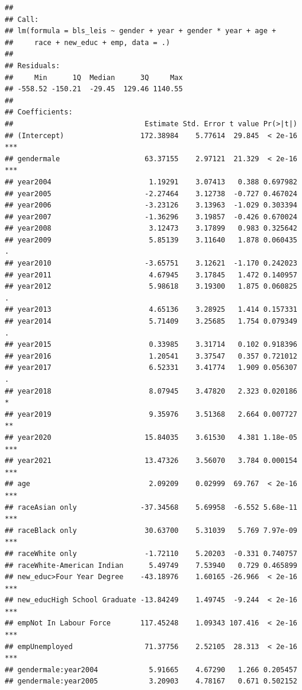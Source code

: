 \documentclass[
]{article}
\begin{document}
\begin{verbatim}
## 
## Call:
## lm(formula = bls_leis ~ gender + year + gender * year + age + 
##     race + new_educ + emp, data = .)
## 
## Residuals:
##     Min      1Q  Median      3Q     Max 
## -558.52 -150.21  -29.45  129.46 1140.55 
## 
## Coefficients:
##                               Estimate Std. Error t value Pr(>|t|)    
## (Intercept)                  172.38984    5.77614  29.845  < 2e-16 ***
## gendermale                    63.37155    2.97121  21.329  < 2e-16 ***
## year2004                       1.19291    3.07413   0.388 0.697982    
## year2005                      -2.27464    3.12738  -0.727 0.467024    
## year2006                      -3.23126    3.13963  -1.029 0.303394    
## year2007                      -1.36296    3.19857  -0.426 0.670024    
## year2008                       3.12473    3.17899   0.983 0.325642    
## year2009                       5.85139    3.11640   1.878 0.060435 .  
## year2010                      -3.65751    3.12621  -1.170 0.242023    
## year2011                       4.67945    3.17845   1.472 0.140957    
## year2012                       5.98618    3.19300   1.875 0.060825 .  
## year2013                       4.65136    3.28925   1.414 0.157331    
## year2014                       5.71409    3.25685   1.754 0.079349 .  
## year2015                       0.33985    3.31714   0.102 0.918396    
## year2016                       1.20541    3.37547   0.357 0.721012    
## year2017                       6.52331    3.41774   1.909 0.056307 .  
## year2018                       8.07945    3.47820   2.323 0.020186 *  
## year2019                       9.35976    3.51368   2.664 0.007727 ** 
## year2020                      15.84035    3.61530   4.381 1.18e-05 ***
## year2021                      13.47326    3.56070   3.784 0.000154 ***
## age                            2.09209    0.02999  69.767  < 2e-16 ***
## raceAsian only               -37.34568    5.69958  -6.552 5.68e-11 ***
## raceBlack only                30.63700    5.31039   5.769 7.97e-09 ***
## raceWhite only                -1.72110    5.20203  -0.331 0.740757    
## raceWhite-American Indian      5.49749    7.53940   0.729 0.465899    
## new_educ>Four Year Degree    -43.18976    1.60165 -26.966  < 2e-16 ***
## new_educHigh School Graduate -13.84249    1.49745  -9.244  < 2e-16 ***
## empNot In Labour Force       117.45248    1.09343 107.416  < 2e-16 ***
## empUnemployed                 71.37756    2.52105  28.313  < 2e-16 ***
## gendermale:year2004            5.91665    4.67290   1.266 0.205457    
## gendermale:year2005            3.20903    4.78167   0.671 0.502152    

\end{verbatim}
\end{document}
